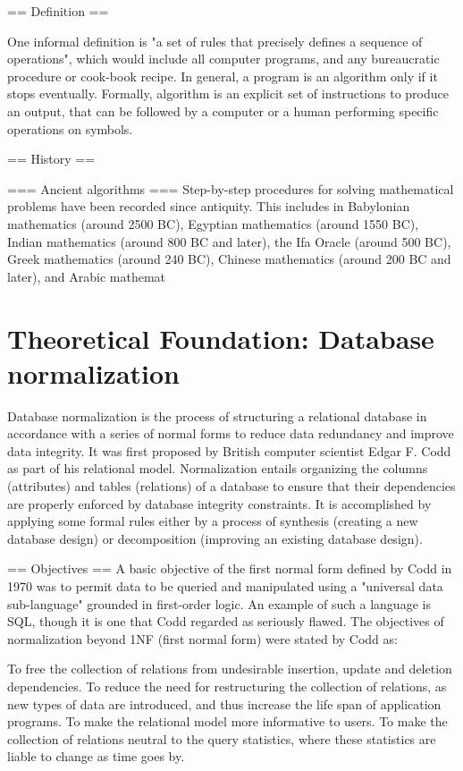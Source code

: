 \documentclass[12pt,a4paper]{report}
\begin{document}
== Definition ==

One informal definition is "a set of rules that precisely defines a sequence of operations", which would include all computer programs, and any bureaucratic procedure
or cook-book recipe. In general, a program is an algorithm only if it stops eventually. Formally, algorithm is an explicit set of instructions to produce an output, that can be followed by a computer or a human performing specific operations on symbols.


== History ==


=== Ancient algorithms ===
Step-by-step procedures for solving mathematical problems have been recorded since antiquity. This includes in Babylonian mathematics (around 2500 BC), Egyptian mathematics (around 1550 BC), Indian mathematics (around 800 BC and later), the Ifa Oracle (around 500 BC), Greek mathematics (around 240 BC), Chinese mathematics (around 200 BC and later), and Arabic mathemat

\section{Theoretical Foundation: Database normalization}
Database normalization is the process of structuring a relational database in accordance with a series of normal forms to reduce data redundancy and improve data integrity. It was first proposed by British computer scientist Edgar F. Codd as part of his relational model.
Normalization entails organizing the columns (attributes) and tables (relations) of a database to ensure that their dependencies are properly enforced by database integrity constraints. It is accomplished by applying some formal rules either by a process of synthesis (creating a new database design) or decomposition (improving an existing database design).


== Objectives ==
A basic objective of the first normal form defined by Codd in 1970 was to permit data to be queried and manipulated using a "universal data sub-language" grounded in first-order logic. An example of such a language is SQL, though it is one that Codd regarded as seriously flawed.
The objectives of normalization beyond 1NF (first normal form) were stated by Codd as:

To free the collection of relations from undesirable insertion, update and deletion dependencies.
To reduce the need for restructuring the collection of relations, as new types of data are introduced, and thus increase the life span of application programs.
To make the relational model more informative to users.
To make the collection of relations neutral to the query statistics, where these statistics are liable to change as time goes by.
\end{document}
